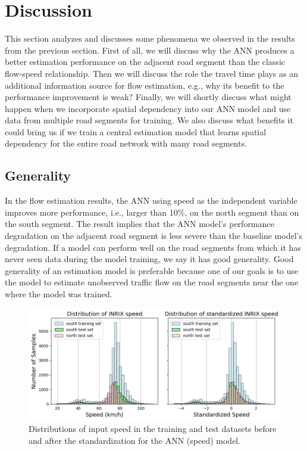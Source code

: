 \documentclass[english]{kththesis}
\begin{document}
\section{Discussion}
\label{sec:discussion}
This section analyzes and discusses some phenomena we observed in the results from the previous section. First of all, we will discuss why the ANN produces a better estimation performance on the adjacent road segment than the classic flow-speed relationship. Then we will discuss the role the travel time plays as an additional information source for flow estimation, e.g., why its benefit to the performance improvement is weak? Finally, we will shortly discuss what might happen when we incorporate spatial dependency into our ANN model and use data from multiple road segments for training. We also discuss what benefits it could bring us if we train a central estimation model that learns spatial dependency for the entire road network with many road segments.

\subsection{Generality}
\label{subsec:generality}

In the flow estimation results, the ANN using speed as the independent variable improves more performance, i.e., larger than 10\%, on the north segment than on the south segment. The result implies that the ANN model's performance degradation on the adjacent road segment is less severe than the baseline model's degradation. If a model can perform well on the road segments from which it has never seen data during the model training, we say it has good generality. Good generality of an estimation model is preferable because one of our goals is to use the model to estimate unobserved traffic flow on the road segments near the one where the model was trained. 

\begin{figure}[!ht]
    \centering
    \includegraphics[width=1.0\textwidth]{speed_distribution_histogram.png}
    \caption{Distributions of input speed in the training and test datasets before and after the standardization for the ANN (speed) model.}
    \label{fig:distribution_histogram}
\end{figure}
\end{document}
